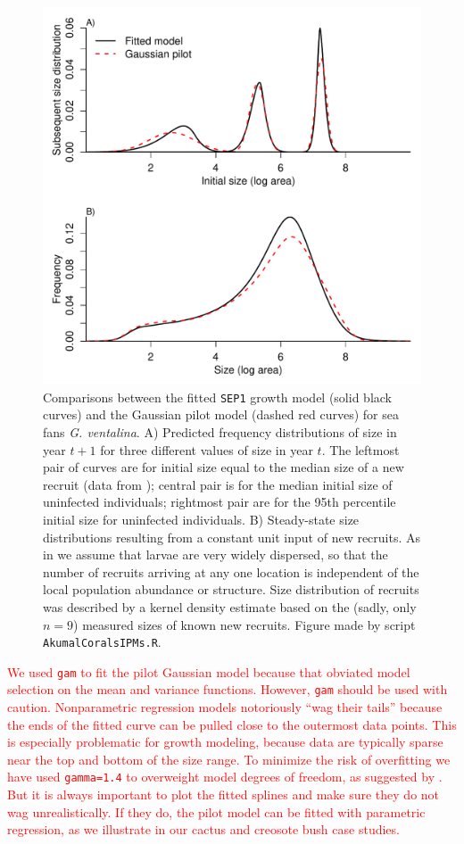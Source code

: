 \documentclass[12pt]{article}
\newcommand{\new}{\textcolor{red}}
\begin{document}
\begin{figure}[tbp]
\centering
\includegraphics[width=.9\textwidth]{figures/CoralKernelCompare.pdf}
\caption{Comparisons between the fitted \texttt{SEP1} growth model (solid black curves) and the Gaussian pilot model (dashed red curves)
for sea fans \emph{G. ventalina}. A) Predicted frequency distributions of size in year $t+1$ for three different values of size in 
year $t$. The leftmost pair of curves are for initial size equal to the median size of a new recruit (data from \citep{bruno-etal-2011}); 
central pair is for the median initial size of uninfected individuals; rightmost pair are for the 95th percentile initial size for uninfected
individuals. B) Steady-state size distributions resulting from a constant unit input of new recruits. As in \citet{bruno-etal-2011} we
assume that larvae are very widely dispersed, so that the number of recruits arriving at any one location is independent of the local population
abundance or structure. Size distribution of recruits was described by a kernel density estimate based on the (sadly, only $n=9$) measured sizes
of known new recruits. Figure made by script \texttt{AkumalCoralsIPMs.R}.}
\label{fig:CoralKernelCompare}
\end{figure}  

\new{We used \texttt{gam} to fit the pilot Gaussian model because that obviated model selection on the mean and variance functions.
However, \texttt{gam} should be used with caution. Nonparametric regression models notoriously ``wag their tails'' because the ends of 
the fitted curve can be pulled close to the outermost data points. This is especially problematic for growth modeling, because data are typically 
sparse near the top and bottom of the size range. To minimize the risk of overfitting we have used \texttt{gamma=1.4} to overweight
model degrees of freedom, as suggested by \citet[][sec. 3.2]{gu-2013}. But it is always important to 
plot the fitted splines and make sure they do not wag unrealistically. If they do, the pilot model 
can be fitted with parametric regression, as we illustrate in our cactus and creosote bush case studies.}
\end{document}
